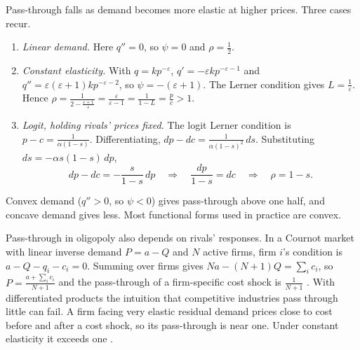 Pass-through falls as demand becomes more elastic at higher prices. Three cases recur.

\begin{enumerate}[label=(\alph*)]
\item \emph{Linear demand.} Here $q'' = 0$, so $\psi = 0$ and $\rho = \frac{1}{2}$.
\item \emph{Constant elasticity.} With $q = k p^{-\varepsilon}$, $q' = -\varepsilon k p^{-\varepsilon - 1}$ and
      $q'' = \varepsilon(\varepsilon + 1)k p^{-\varepsilon - 2}$, so $\psi = -(\varepsilon + 1)$. The Lerner condition
      gives $L = \frac{1}{\varepsilon}$. Hence $\rho = \frac{1}{2 - \frac{\varepsilon + 1}{\varepsilon}} =
      \frac{\varepsilon}{\varepsilon - 1} = \frac{1}{1 - L} = \frac{p}{c} > 1$.
\item \emph{Logit, holding rivals' prices fixed.} The logit Lerner condition is $p - c = \frac{1}{\alpha(1 - s)}$.
      Differentiating, $dp - dc = \frac{1}{\alpha(1 - s)^2}\,ds$. Substituting $ds = -\alpha s(1 - s)\,dp$,
      \begin{equation*}
        dp - dc = -\frac{s}{1 - s}\,dp
        \quad\Longrightarrow\quad
        \frac{dp}{1 - s} = dc
        \quad\Longrightarrow\quad
        \rho = 1 - s .
      \end{equation*}
\end{enumerate}
Convex demand ($q'' > 0$, so $\psi < 0$) gives pass-through above one half, and concave demand gives less. Most
functional forms used in practice are convex.

Pass-through in oligopoly also depends on rivals' responses. In a Cournot market with linear inverse demand
$P = a - Q$ and $N$ active firms, firm $i$'s condition is $a - Q - q_i - c_i = 0$. Summing over firms gives
$Na - (N+1)Q = \sum_i c_i$, so $P = \frac{a + \sum_i c_i}{N + 1}$ and the pass-through of a firm-specific cost shock is
$\frac{1}{N+1}$ \citep{BergstromVarian1985}. With differentiated products the intuition that competitive industries
pass through little can fail. A firm facing very elastic residual demand prices close to cost before and after a cost
shock, so its pass-through is near one. Under constant elasticity it exceeds one \citep[Section 3.D]{FarrellShapiro2010}.

